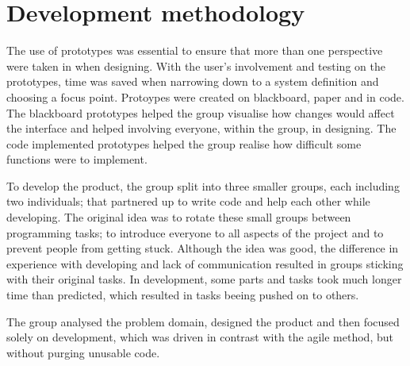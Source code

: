 \section{Development methodology}

The use of prototypes was essential to ensure that more than one perspective were taken in when designing. With the user's involvement and testing on the prototypes, time was saved when narrowing down to a system definition and choosing a focus point. Protoypes were created on blackboard, paper and in code. The blackboard prototypes helped the group visualise how changes would affect the interface and helped involving everyone, within the group, in designing. The code implemented prototypes helped the group realise how difficult some functions were to implement.

To develop the product, the group split into three smaller groups, each including two individuals; that partnered up to write code and help each other while developing.
The original idea was to rotate these small groups between programming tasks; to introduce everyone to all aspects of the project and to prevent people from getting stuck.
Although the idea was good, the difference in experience with developing and lack of communication resulted in groups sticking with their original tasks.
In development, some parts and tasks took much longer time than predicted, which resulted in tasks beeing pushed on to others.

The group analysed the problem domain, designed the product and then focused solely on development, which was driven in contrast with the agile method, but without purging unusable code.


